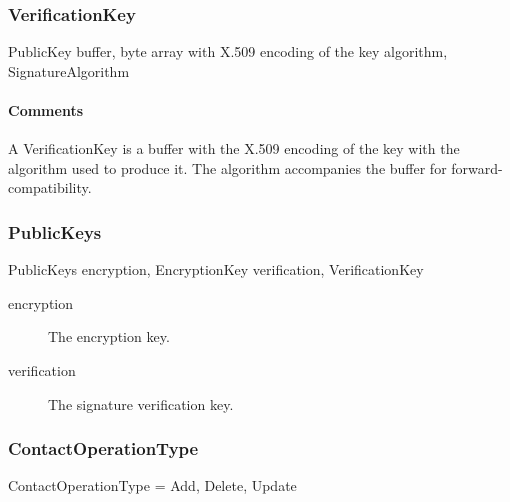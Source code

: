 \documentclass[a4paper,10pt]{article}
\begin{document}
\subsubsection{VerificationKey}

\begin{verbbox}
PublicKey
{
  buffer, byte array with X.509 encoding of the key
  algorithm, SignatureAlgorithm
}
\end{verbbox}
\begin{center}
\theverbbox
\end{center}

\begin{inparaitem}[ ]
 \item \infrastructure
\end{inparaitem}

\paragraph*{Comments}
A VerificationKey is a buffer with the X.509 encoding of the key with the algorithm used to produce it. The algorithm accompanies the buffer for forward-compatibility.

\subsubsection{PublicKeys}

\begin{verbbox}
PublicKeys
{
  encryption, EncryptionKey
  verification, VerificationKey
}
\end{verbbox}
\begin{center}
\theverbbox
\end{center}

\begin{inparaitem}[ ]
 \item \infrastructure
\end{inparaitem}

\SpecialItem
\begin{description}
 \item[encryption] The encryption key.
 \item[verification] The signature verification key.
\end{description}

\subsubsection{ContactOperationType}

\begin{verbbox}
ContactOperationType = { Add, Delete, Update }
\end{verbbox}
\begin{center}
\theverbbox
\end{center}
\end{document}
